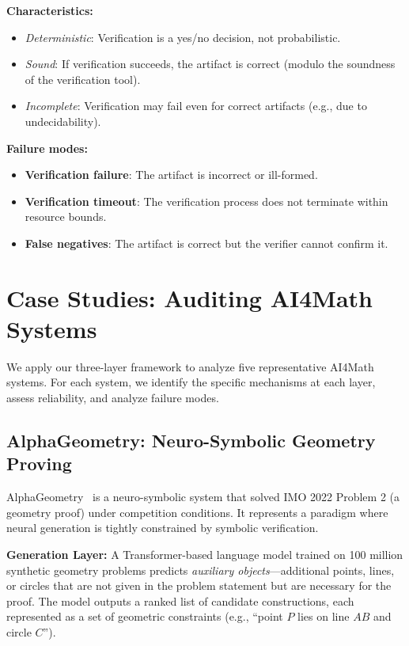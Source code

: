 \documentclass[11pt,a4paper]{article}
\begin{document}
\textbf{Characteristics:}
\begin{itemize}
  \item \emph{Deterministic}: Verification is a yes/no decision, not probabilistic.
  \item \emph{Sound}: If verification succeeds, the artifact is correct (modulo the soundness of the verification tool).
  \item \emph{Incomplete}: Verification may fail even for correct artifacts (e.g., due to undecidability).
\end{itemize}

\textbf{Failure modes:}
\begin{itemize}
  \item \textbf{Verification failure}: The artifact is incorrect or ill-formed.
  \item \textbf{Verification timeout}: The verification process does not terminate within resource bounds.
  \item \textbf{False negatives}: The artifact is correct but the verifier cannot confirm it.
\end{itemize}

\section{Case Studies: Auditing AI4Math Systems}
\label{sec:cases}

We apply our three-layer framework to analyze five representative AI4Math systems. For each system, we identify the specific mechanisms at each layer, assess reliability, and analyze failure modes.

\subsection{AlphaGeometry: Neuro-Symbolic Geometry Proving}

AlphaGeometry~\cite{trinh2024solving} is a neuro-symbolic system that solved IMO 2022 Problem 2 (a geometry proof) under competition conditions. It represents a paradigm where neural generation is tightly constrained by symbolic verification.

\textbf{Generation Layer:} A Transformer-based language model trained on 100 million synthetic geometry problems predicts \emph{auxiliary objects}---additional points, lines, or circles that are not given in the problem statement but are necessary for the proof. The model outputs a ranked list of candidate constructions, each represented as a set of geometric constraints (e.g., ``point $P$ lies on line $AB$ and circle $C$'').
\end{document}
